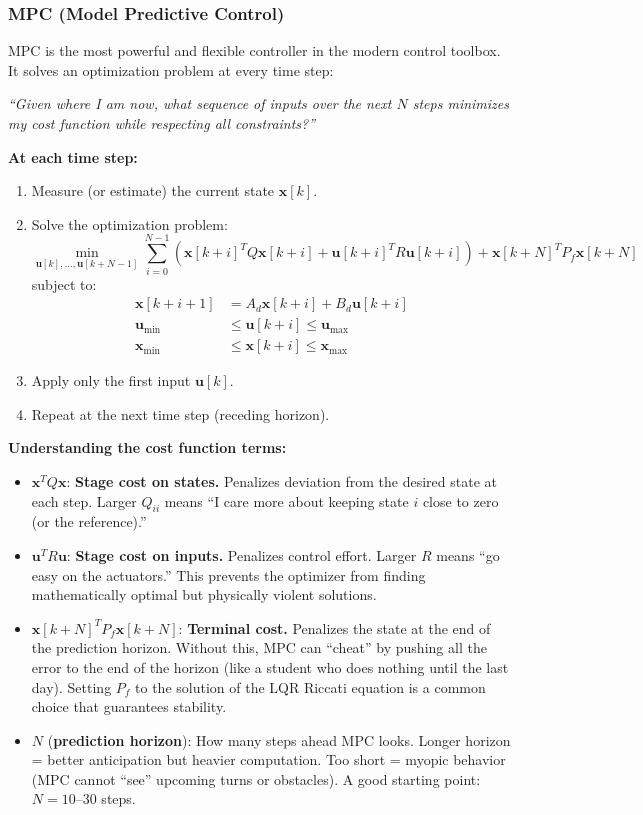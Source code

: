 \subsubsection{MPC (Model Predictive Control)}

MPC is the most powerful and flexible controller in the modern control toolbox. It solves an optimization problem at every time step:

\textit{``Given where I am now, what sequence of inputs over the next $N$ steps minimizes my cost function while respecting all constraints?''}

\textbf{At each time step:}
\begin{enumerate}
    \item Measure (or estimate) the current state $\mathbf{x}[k]$.
    \item Solve the optimization problem:
    \begin{equation}
    \min_{\mathbf{u}[k], \ldots, \mathbf{u}[k+N-1]} \sum_{i=0}^{N-1} \left( \mathbf{x}[k+i]^T Q \mathbf{x}[k+i] + \mathbf{u}[k+i]^T R \mathbf{u}[k+i] \right) + \mathbf{x}[k+N]^T P_f \mathbf{x}[k+N]
    \end{equation}
    subject to:
    \begin{align}
    \mathbf{x}[k+i+1] &= A_d \mathbf{x}[k+i] + B_d \mathbf{u}[k+i] \\
    \mathbf{u}_{\min} &\leq \mathbf{u}[k+i] \leq \mathbf{u}_{\max} \\
    \mathbf{x}_{\min} &\leq \mathbf{x}[k+i] \leq \mathbf{x}_{\max}
    \end{align}
    \item Apply only the first input $\mathbf{u}[k]$.
    \item Repeat at the next time step (receding horizon).
\end{enumerate}

\textbf{Understanding the cost function terms:}
\begin{itemize}
    \item $\mathbf{x}^T Q \mathbf{x}$: \textbf{Stage cost on states.} Penalizes deviation from the desired state at each step. Larger $Q_{ii}$ means ``I care more about keeping state $i$ close to zero (or the reference).''
    \item $\mathbf{u}^T R \mathbf{u}$: \textbf{Stage cost on inputs.} Penalizes control effort. Larger $R$ means ``go easy on the actuators.'' This prevents the optimizer from finding mathematically optimal but physically violent solutions.
    \item $\mathbf{x}[k+N]^T P_f \mathbf{x}[k+N]$: \textbf{Terminal cost.} Penalizes the state at the end of the prediction horizon. Without this, MPC can ``cheat'' by pushing all the error to the end of the horizon (like a student who does nothing until the last day). Setting $P_f$ to the solution of the LQR Riccati equation is a common choice that guarantees stability.
    \item $N$ (\textbf{prediction horizon}): How many steps ahead MPC looks. Longer horizon = better anticipation but heavier computation. Too short = myopic behavior (MPC cannot ``see'' upcoming turns or obstacles). A good starting point: $N = 10$--$30$ steps.
\end{itemize}

